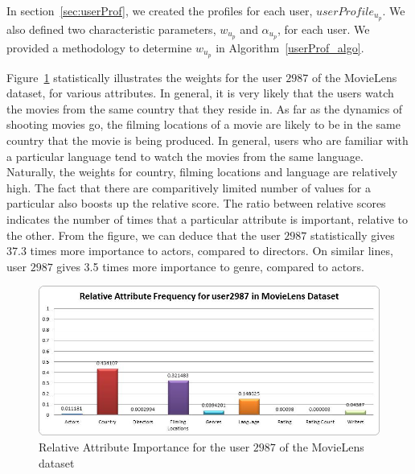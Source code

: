 \documentclass{acm_proc_article-sp}
\begin{document}
% 

In section~\ref{sec:userProf}, we created the profiles for each user, $userProfile_{u_p}$. We also defined two characteristic parameters, $w_{u_p}$ and $\alpha_{u_p}$, for each user. We provided a methodology to determine $w_{u_p}$ in Algorithm~\ref{userProf_algo}.

Figure~\ref{movielens_attrRelFreq_user} statistically illustrates the weights for the user $2987$ of the MovieLens dataset, for various attributes. In general, it is very likely that the users watch the movies from the same country that they reside in. As far as the dynamics of shooting movies go, the filming locations of a movie are likely to be in the same country that the movie is being produced. In general, users who are familiar with a particular language tend to watch the movies from the same language. Naturally, the weights for country, filming locations and language are relatively high. The fact that there are comparitively limited number of values for a particular also boosts up the relative score. The ratio between relative scores indicates the number of times that a particular attribute is important, relative to the other. From the figure, we can deduce that the user $2987$ statistically gives $37.3$ times more importance to actors, compared to directors. On similar lines, user $2987$ gives 3.5 
times more importance to genre, compared to actors.

\begin{figure}[htp]
\centering
\includegraphics[scale=0.38]{Results/movielens_attrRelFreq_user2987.jpg}
\caption{Relative Attribute Importance for the user $2987$ of the MovieLens dataset}
\label{movielens_attrRelFreq_user}
\end{figure}
\end{document}

